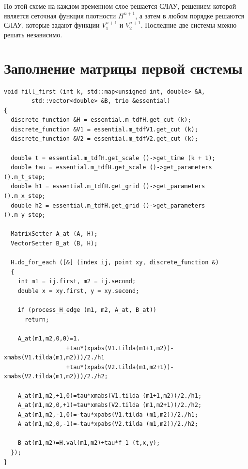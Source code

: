 \documentclass[a4paper,11pt]{article}
\begin{document}
По этой схеме на каждом
временном слое решается СЛАУ, решением которой является сеточная функция
плотности $H^{n+1}$, а затем в любом порядке решаются СЛАУ, которые
задают функции $V_1^{n+1}$ и $V_2^{n+1}$. Последние две системы можно решать
независимо.














\newpage
\section{Заполнение матрицы первой системы}
\begin{verbatim}
void fill_first (int k, std::map<unsigned int, double> &A, 
		std::vector<double> &B, trio &essential)
{
  discrete_function &H = essential.m_tdfH.get_cut (k);
  discrete_function &V1 = essential.m_tdfV1.get_cut (k);
  discrete_function &V2 = essential.m_tdfV2.get_cut (k);

  double t = essential.m_tdfH.get_scale ()->get_time (k + 1);
  double tau = essential.m_tdfH.get_scale ()->get_parameters ().m_t_step;
  double h1 = essential.m_tdfH.get_grid ()->get_parameters ().m_x_step;
  double h2 = essential.m_tdfH.get_grid ()->get_parameters ().m_y_step;

  MatrixSetter A_at (A, H);
  VectorSetter B_at (B, H);

  H.do_for_each ([&] (index ij, point xy, discrete_function &)
  {
    int m1 = ij.first, m2 = ij.second;
    double x = xy.first, y = xy.second;

    if (process_H_edge (m1, m2, A_at, B_at))
      return;

    A_at(m1,m2,0,0)=1.
                  +tau*(xpabs(V1.tilda(m1+1,m2))-xmabs(V1.tilda(m1,m2)))/2./h1
                  +tau*(xpabs(V2.tilda(m1,m2+1))-xmabs(V2.tilda(m1,m2)))/2./h2;

    A_at(m1,m2,+1,0)=tau*xmabs(V1.tilda (m1+1,m2))/2./h1;
    A_at(m1,m2,0,+1)=tau*xmabs(V2.tilda (m1,m2+1))/2./h2;
    A_at(m1,m2,-1,0)=-tau*xpabs(V1.tilda (m1,m2))/2./h1;
    A_at(m1,m2,0,-1)=-tau*xpabs(V2.tilda (m1,m2))/2./h2;

    B_at(m1,m2)=H.val(m1,m2)+tau*f_1 (t,x,y);
  });
}
\end{verbatim}
\newpage
\end{document}
